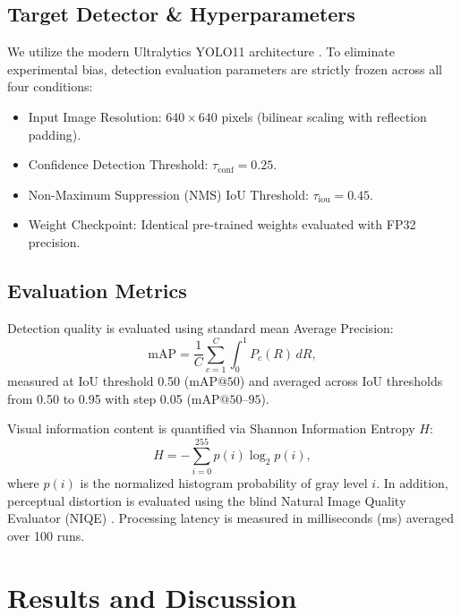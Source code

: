 \documentclass[conference]{IEEEtran}
\begin{document}
\subsection{Target Detector & Hyperparameters}
We utilize the modern Ultralytics YOLO11 architecture \cite{jocher2024yolo11}. To eliminate experimental bias, detection evaluation parameters are strictly frozen across all four conditions:
\begin{itemize}
    \item Input Image Resolution: $640 \times 640$ pixels (bilinear scaling with reflection padding).
    \item Confidence Detection Threshold: $\tau_{\text{conf}} = 0.25$.
    \item Non-Maximum Suppression (NMS) IoU Threshold: $\tau_{\text{iou}} = 0.45$.
    \item Weight Checkpoint: Identical pre-trained weights evaluated with FP32 precision.
\end{itemize}

\subsection{Evaluation Metrics}
Detection quality is evaluated using standard mean Average Precision:
\begin{equation}
\text{mAP} = \frac{1}{C} \sum_{c=1}^{C} \int_{0}^{1} P_c(R)\, dR,
\end{equation}
measured at IoU threshold 0.50 ($\text{mAP@50}$) and averaged across IoU thresholds from 0.50 to 0.95 with step 0.05 ($\text{mAP@50--95}$).

Visual information content is quantified via Shannon Information Entropy $H$:
\begin{equation}
H = -\sum_{i=0}^{255} p(i) \log_2 p(i),
\end{equation}
where $p(i)$ is the normalized histogram probability of gray level $i$. In addition, perceptual distortion is evaluated using the blind Natural Image Quality Evaluator (NIQE) \cite{mittal2013making}. Processing latency is measured in milliseconds (ms) averaged over 100 runs.

\section{Results and Discussion}
\end{document}
